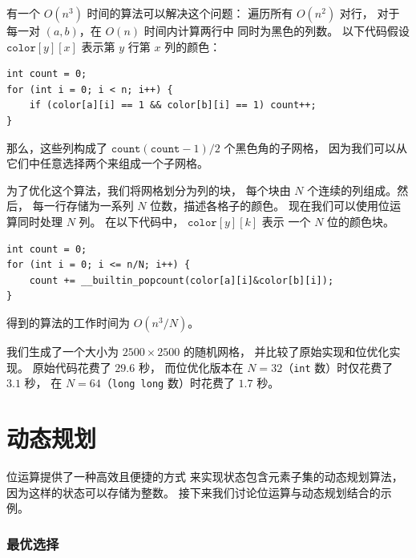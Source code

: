 有一个 $O(n^3)$ 时间的算法可以解决这个问题：
遍历所有 $O(n^2)$ 对行，
对于每一对 $(a,b)$，在 $O(n)$ 时间内计算两行中
同时为黑色的列数。
以下代码假设 $\texttt{color}[y][x]$
表示第 $y$ 行第 $x$ 列的颜色：
\begin{lstlisting}
int count = 0;
for (int i = 0; i < n; i++) {
    if (color[a][i] == 1 && color[b][i] == 1) count++;
}
\end{lstlisting}
那么，这些列构成了 $\texttt{count}(\texttt{count}-1)/2$ 个黑色角的子网格，
因为我们可以从它们中任意选择两个来组成一个子网格。

为了优化这个算法，我们将网格划分为列的块，
每个块由 $N$ 个连续的列组成。然后，
每一行存储为一系列 $N$ 位数，描述各格子的颜色。
现在我们可以使用位运算同时处理 $N$ 列。
在以下代码中，
$\texttt{color}[y][k]$ 表示
一个 $N$ 位的颜色块。
\begin{lstlisting}
int count = 0;
for (int i = 0; i <= n/N; i++) {
    count += __builtin_popcount(color[a][i]&color[b][i]);
}
\end{lstlisting}
得到的算法的工作时间为 $O(n^3/N)$。

我们生成了一个大小为 $2500 \times 2500$ 的随机网格，
并比较了原始实现和位优化实现。
原始代码花费了 $29.6$ 秒，
而位优化版本在 $N=32$（\texttt{int} 数）时仅花费了 $3.1$ 秒，
在 $N=64$（\texttt{long long} 数）时花费了 $1.7$ 秒。

\section{动态规划}

位运算提供了一种高效且便捷的方式
来实现状态包含元素子集的动态规划算法，
因为这样的状态可以存储为整数。
接下来我们讨论位运算与动态规划结合的示例。

\subsubsection{最优选择}

